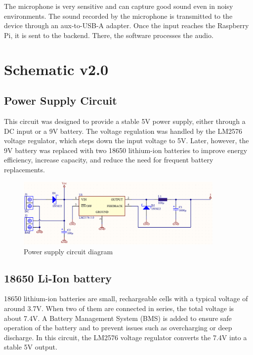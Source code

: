 The microphone is very sensitive and can capture good sound even in noisy environments.
The sound recorded by the microphone is transmitted to the device through an aux-to-USB-A adapter. Once the input reaches the Raspberry Pi, it is sent to the backend. There, the software processes the audio.

\section{Schematic v2.0}

\subsection{Power Supply Circuit}
This circuit was designed to provide a stable 5V power supply, either through a DC input or a 9V battery. The voltage regulation was handled by the LM2576 voltage regulator, which steps down the input voltage to 5V. Later, however, the 9V battery was replaced with two 18650 lithium-ion batteries to improve energy efficiency, increase capacity, and reduce the need for frequent battery replacements.

\begin{figure}[H]
  \centering
  \includegraphics[width=0.9\textwidth]{assets/Power Supply}
  \caption{Power supply circuit diagram}
\end{figure}

\subsection{18650 Li-Ion battery}
18650 lithium-ion batteries are small, rechargeable cells with a typical voltage of around 3.7V. When two of them are connected in series, the total voltage is about 7.4V. A Battery Management System (BMS) is added to ensure safe operation of the battery and to prevent issues such as overcharging or deep discharge. In this circuit, the LM2576 voltage regulator converts the 7.4V into a stable 5V output.

